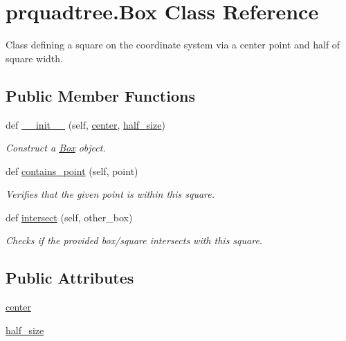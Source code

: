 \section{prquadtree.\+Box Class Reference}
\label{classprquadtree_1_1Box}


Class defining a square on the coordinate system via a center point and half of square width.  


\subsection*{Public Member Functions}
\begin{DoxyCompactItemize}
\item 
def \hyperlink{classprquadtree_1_1Box_a0ff4532e81c55a7b41c35e85b0099168}{\+\_\+\+\_\+init\+\_\+\+\_\+} (self, \hyperlink{classprquadtree_1_1Box_a97475b97164cac388fc673e08ce2707e}{center}, \hyperlink{classprquadtree_1_1Box_ac40b9c6e566a2ca829a2e84e3f741294}{half\+\_\+size})
\begin{DoxyCompactList}\small\item\em Construct a \hyperlink{classprquadtree_1_1Box}{Box} object. \end{DoxyCompactList}\item 
def \hyperlink{classprquadtree_1_1Box_a3f8878c3fa9a89b786103d31821304df}{contains\+\_\+point} (self, point)
\begin{DoxyCompactList}\small\item\em Verifies that the given point is within this square. \end{DoxyCompactList}\item 
def \hyperlink{classprquadtree_1_1Box_af8b0a29f1094809b6ae0793077d51648}{intersect} (self, other\+\_\+box)
\begin{DoxyCompactList}\small\item\em Checks if the provided box/square intersects with this square. \end{DoxyCompactList}\end{DoxyCompactItemize}
\subsection*{Public Attributes}
\begin{DoxyCompactItemize}
\item 
\hyperlink{classprquadtree_1_1Box_a97475b97164cac388fc673e08ce2707e}{center}
\item 
\hyperlink{classprquadtree_1_1Box_ac40b9c6e566a2ca829a2e84e3f741294}{half\+\_\+size}
\end{DoxyCompactItemize}


